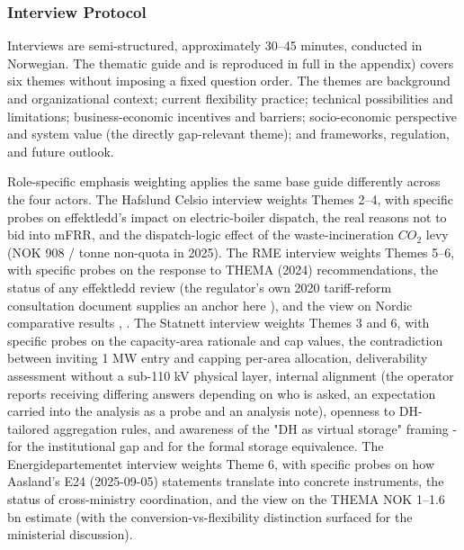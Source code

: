 \subsubsection{Interview Protocol}
\label{3-subsec:3.5.2 interview protocol}

Interviews are semi-structured, approximately 30–45 minutes, conducted in Norwegian. The thematic guide  and is reproduced in full in the appendix) covers six themes without imposing a fixed question order. The themes are background and organizational context; current flexibility practice; technical possibilities and limitations; business-economic incentives and barriers; socio-economic perspective and system value (the directly gap-relevant theme); and frameworks, regulation, and future outlook.

Role-specific emphasis weighting applies the same base guide differently across the four actors. The Hafslund Celsio interview weights Themes 2–4, with specific probes on effektledd's impact on electric-boiler dispatch, the real reasons not to bid into mFRR, and the dispatch-logic effect of the waste-incineration $CO_2$ levy (NOK 908 / tonne non-quota in 2025). The RME interview weights Themes 5–6, with specific probes on the response to THEMA (2024) recommendations, the status of any effektledd review (the regulator's own 2020 tariff-reform consultation document supplies an anchor here \cite{eriksen_proposed_2022}), and the view on Nordic comparative results \cite{bergaentzle_cross-sector_2022}, \cite{sandberg_energy_2019}. The Statnett interview weights Themes 3 and 6, with specific probes on the capacity-area rationale and cap values, the contradiction between inviting 1 MW entry and capping per-area allocation, deliverability assessment without a sub-110 kV physical layer, internal alignment (the operator reports receiving differing answers depending on who is asked, an expectation carried into the analysis as a probe and an analysis note), openness to DH-tailored aggregation rules, and awareness of the "DH as virtual storage" framing - \cite{mitridati_heat_2020} for the institutional gap and \cite{mitridati_power_2018} for the formal storage equivalence. The Energidepartementet interview weights Theme 6, with specific probes on how Aasland's E24 (2025-09-05) statements translate into concrete instruments, the status of cross-ministry coordination, and the view on the THEMA NOK 1–1.6 bn estimate (with the conversion-vs-flexibility distinction surfaced for the ministerial discussion).

